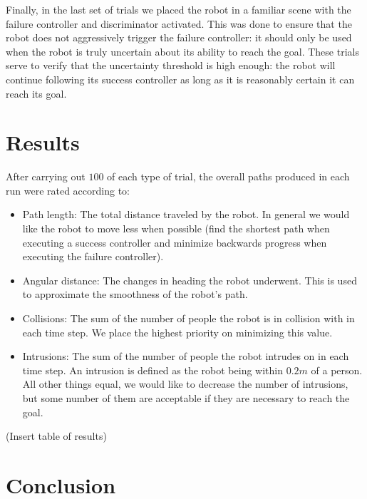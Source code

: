 \documentclass[letterpaper]{article}
\begin{document}
		Finally, in the last set of trials we placed the robot in a familiar scene with the failure controller and discriminator activated. This was done to ensure that the robot does not aggressively trigger the failure controller: it should only be used when the robot is truly uncertain about its ability to reach the goal. These trials serve to verify that the uncertainty threshold is high enough: the robot will continue following its success controller as long as it is reasonably certain it can reach its goal. 
		
	\section{Results}\label{sec:results}
		After carrying out $100$ of each type of trial, the overall paths produced in each run were rated according to:
		\begin{itemize}
			\item Path length: The total distance traveled by the robot. In general we would like the robot to move less when possible (find the shortest path when executing a success controller and minimize backwards progress when executing the failure controller).
			\item Angular distance: The changes in heading the robot underwent. This is used to approximate the smoothness of the robot's path.
			\item Collisions: The sum of the number of people the robot is in collision with in each time step. We place the highest priority on minimizing this value.
			\item Intrusions: The sum of the number of people the robot intrudes on in each time step. An intrusion is defined as the robot being within $0.2m$ of a person. All other things equal, we would like to decrease the number of intrusions, but some number of them are acceptable if they are necessary to reach the goal.
		\end{itemize}
		
		(Insert table of results)
	
	\section{Conclusion}\label{sec:conclusion}
	
	
	
	
\end{document}

